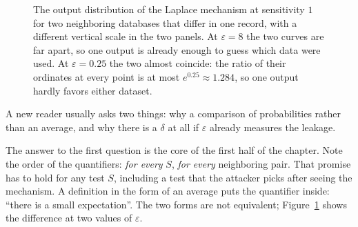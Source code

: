 \begin{figure}[htbp]
\centering
{}
\hfill
{}
\caption{The output distribution of the Laplace mechanism at sensitivity $1$ for two
neighboring databases that differ in one record, with a different vertical scale in the
two panels. At $\varepsilon=8$ the two curves are far apart, so one output is already
enough to guess which data were used. At $\varepsilon=0.25$ the two almost coincide: the
ratio of their ordinates at every point is at most $e^{0.25}\approx1.284$, so one output
hardly favors either dataset.}
\label{fig:dua-sebaran}
\end{figure}

A new reader usually asks two things: why a comparison of probabilities rather than an
average, and why there is a $\delta$ at all if $\varepsilon$ already measures the
leakage.

The answer to the first question is the core of the first half of the chapter. Note the
order of the quantifiers: \emph{for every} $S$, \emph{for every} neighboring pair. That
promise has to hold for any test $S$, including a test that the attacker picks after
seeing the mechanism. A definition in the form of an average puts the quantifier inside:
``there is a small expectation''. The two forms are not equivalent;
Figure~\ref{fig:dua-sebaran} shows the difference at two values of $\varepsilon$.

